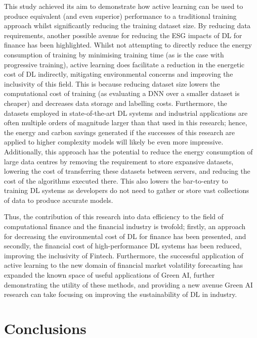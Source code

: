 \documentclass[a4paper, 11pt]{report}
\begin{document}
    This study achieved its aim to demonstrate how active learning can be used to produce equivalent (and even superior) performance to a traditional training approach whilst significantly reducing the training dataset size. By reducing data requirements, another possible avenue for reducing the ESG impacts of DL for finance has been highlighted. Whilst not attempting to directly reduce the energy consumption of training by minimising training time (as is the case with progressive training), active learning does facilitate a reduction in the energetic cost of DL indirectly, mitigating environmental concerns and improving the inclusivity of this field. This is because reducing dataset size lowers the computational cost of training (as evaluating a DNN over a smaller dataset is cheaper) and decreases data storage and labelling costs. Furthermore, the datasets employed in state-of-the-art DL systems and industrial applications are often multiple orders of magnitude larger than that used in this research; hence, the energy and carbon savings generated if the successes of this research are applied to higher complexity models will likely be even more impressive. Additionally, this approach has the potential to reduce the energy consumption of large data centres by removing the requirement to store expansive datasets, lowering the cost of transferring these datasets between servers, and reducing the cost of the algorithms executed there. This also lowers the bar-to-entry to training DL systems as developers do not need to gather or store vast collections of data to produce accurate models. 
    
    Thus, the contribution of this research into data efficiency to the field of computational finance and the financial industry is twofold; firstly, an approach for decreasing the environmental cost of DL for finance has been presented, and secondly, the financial cost of high-performance DL systems has been reduced, improving the inclusivity of Fintech. Furthermore, the successful application of active learning to the new domain of financial market volatility forecasting has expanded the known space of useful applications of Green AI, further demonstrating the utility of these methods, and providing a new avenue Green AI research can take focusing on improving the sustainability of DL in industry.


    \newpage
    \chapter{Conclusions}
    \label{chapter: conclusion}
\end{document}
